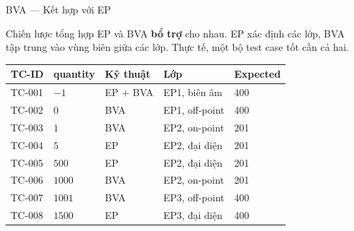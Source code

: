 \documentclass[aspectratio=169,12pt]{beamer}
\begin{document}
\begin{frame}{BVA --- Kết hợp với EP}
  \begin{block}{Chiến lược tổng hợp}
    EP và BVA \textbf{bổ trợ} cho nhau.
    EP xác định các lớp, BVA tập trung vào vùng biên giữa các lớp.
    Thực tế, một bộ test case tốt cần cả hai.
  \end{block}

  \vspace{0.5em}
  \begin{center}
  \small
  \begin{tabular}{lllll}
    \toprule
    \textbf{TC-ID} & \textbf{quantity} & \textbf{Kỹ thuật} & \textbf{Lớp} & \textbf{Expected} \\
    \midrule
    TC-001 & $-1$   & EP + BVA & EP1, biên âm     & 400 \\
    TC-002 & $0$    & BVA      & EP1, off-point   & 400 \\
    TC-003 & $1$    & BVA      & EP2, on-point    & 201 \\
    TC-004 & $5$    & EP       & EP2, đại diện    & 201 \\
    TC-005 & $500$  & EP       & EP2, đại diện    & 201 \\
    TC-006 & $1000$ & BVA      & EP2, on-point    & 201 \\
    TC-007 & $1001$ & BVA      & EP3, off-point   & 400 \\
    TC-008 & $1500$ & EP       & EP3, đại diện    & 400 \\
    \bottomrule
  \end{tabular}
  \end{center}
\end{frame}
\end{document}

